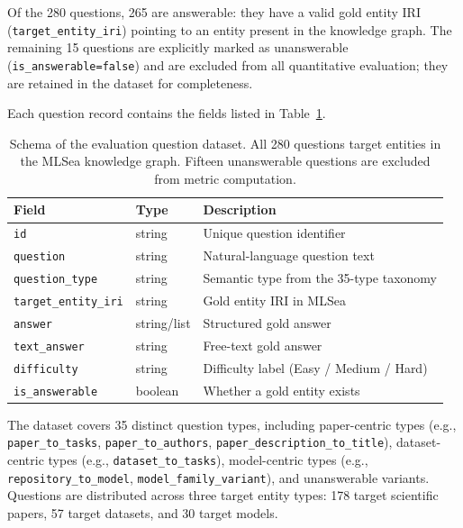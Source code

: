 Of the 280 questions, 265 are answerable: they have a valid gold entity IRI
(\texttt{target\_entity\_iri}) pointing to an entity present in the knowledge
graph.
The remaining 15 questions are explicitly marked as unanswerable
(\texttt{is\_answerable=false}) and are excluded from all quantitative
evaluation; they are retained in the dataset for completeness.

Each question record contains the fields listed in
Table~\ref{tab:question_dataset}.

\begin{table}[htbp]
  \centering
  \caption{Schema of the evaluation question dataset. All 280 questions
    target entities in the MLSea knowledge graph. Fifteen unanswerable
    questions are excluded from metric computation.}
  \label{tab:question_dataset}
  \begin{tabular}{lll}
    \toprule
    Field & Type & Description \\
    \midrule
    \texttt{id}               & string  & Unique question identifier \\
    \texttt{question}         & string  & Natural-language question text \\
    \texttt{question\_type}   & string  & Semantic type from the 35-type taxonomy \\
    \texttt{target\_entity\_iri} & string & Gold entity IRI in MLSea \\
    \texttt{answer}           & string/list & Structured gold answer \\
    \texttt{text\_answer}     & string  & Free-text gold answer \\
    \texttt{difficulty}       & string  & Difficulty label (Easy / Medium / Hard) \\
    \texttt{is\_answerable}   & boolean & Whether a gold entity exists \\
    \bottomrule
  \end{tabular}
\end{table}

The dataset covers 35 distinct question types, including paper-centric types
(e.g., \texttt{paper\_to\_tasks}, \texttt{paper\_to\_authors},
\texttt{paper\_description\_to\_title}), dataset-centric types
(e.g., \texttt{dataset\_to\_tasks}), model-centric types
(e.g., \texttt{repository\_to\_model}, \texttt{model\_family\_variant}),
and unanswerable variants.
Questions are distributed across three target entity types: 178 target
scientific papers, 57 target datasets, and 30 target models.

